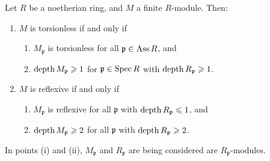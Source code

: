 \documentclass[12pt]{article}
\begin{document}
\begin{prop} \label{prop:torsionless-reflexive-check-locally}
	Let $R$ be a noetherian ring, and $M$ a finite $R$-module. Then:
	\begin{enumerate}[label=(\alph*)]
		\item $M$ is torsionless if and only if
		\begin{enumerate}[label=(\roman*)]
			\item $M_{\mathfrak{p}}$ is torsionless for all $\mathfrak{p} \in \operatorname{Ass} R$, and
			\item $\operatorname{depth} M_{\mathfrak{p}} \geqslant 1$ for $\mathfrak{p} \in \operatorname{Spec} R$ with $\operatorname{depth} R_{\mathfrak{p}} \geqslant 1$.
		\end{enumerate}
		\item $M$ is reflexive if and only if
		\begin{enumerate}[label=(\roman*)]
			\item $M_{\mathfrak{p}}$ is reflexive for all $\mathfrak{p}$ with $\operatorname{depth} R_{\mathfrak{p}} \leqslant 1$, and
			\item $\operatorname{depth} M_{\mathfrak{p}} \geqslant 2$ for all $\mathfrak{p}$ with $\operatorname{depth} R_{\mathfrak{p}} \geqslant 2$.
		\end{enumerate}
	\end{enumerate}
\end{prop}
In points (i) and (ii), $M_{\mathfrak{p}}$ and $R_{\mathfrak{p}}$ are being considered are $R_{\mathfrak{p}}$-modules.
\end{document}

